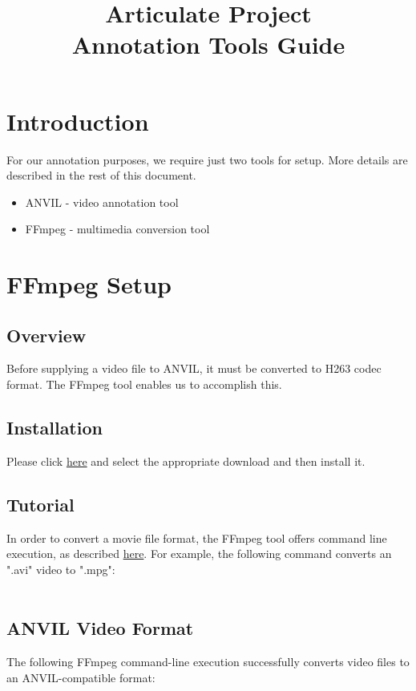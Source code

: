 \documentclass[]{article}
\title{Articulate Project \\
Annotation Tools Guide}
\begin{document}
\maketitle

\section{Introduction}
For our annotation purposes, we require just two tools for setup. More details are described in the rest of this document.
\begin{itemize}
	\item ANVIL - video annotation tool
	\item FFmpeg - multimedia conversion tool 
\end{itemize}

\section{FFmpeg Setup}
\subsection{Overview}
Before supplying a video file to ANVIL, it must be converted to H263 codec format. The FFmpeg tool enables us to accomplish this.
\subsection{Installation}
Please click \href{https://www.ffmpeg.org/download.html}{here} and select the appropriate download and then install it.
\subsection{Tutorial}
In order to convert a movie file format, the FFmpeg tool offers command line execution, as described \href{https://www.ffmpeg.org/ffmpeg.html}{here}. For example, the following command converts an ".avi" video to ".mpg": \\\\ 

\subsection{ANVIL Video Format}
The following FFmpeg command-line execution successfully converts video files to an ANVIL-compatible format: \\
 \\
\end{document}
